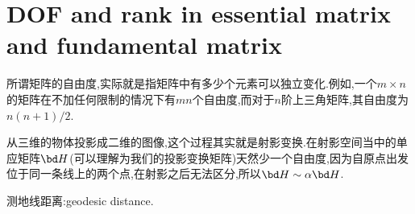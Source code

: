 \section{DOF and rank in essential matrix and fundamental matrix}
	\label{DOFandRank}
	所谓矩阵的自由度,实际就是指矩阵中有多少个元素可以独立变化.例如,一个$m \times n$的矩阵在不加任何限制的情况下有$mn$个自由度,而对于$n$阶上三角矩阵,其自由度为$n(n+1)/2$.
	
	从三维的物体投影成二维的图像,这个过程其实就是射影变换.在射影空间当中的单应矩阵$\bd H$(可以理解为我们的投影变换矩阵)天然少一个自由度,因为自原点出发位于同一条线上的两个点,在射影之后无法区分,所以$\bd H \sim \alpha \bd H$.
	
	测地线距离:geodesic distance.
	